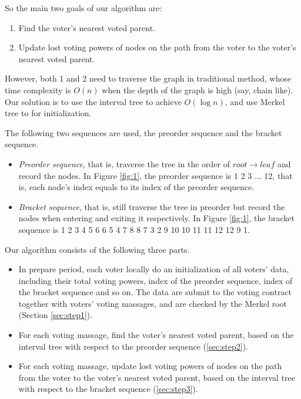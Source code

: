 So the main two goals of our algorithm are:
\begin{enumerate}
	\item Find the voter's nearest voted parent.
	\item Update lost voting powers of nodes on the path from the voter to the voter's nearest voted parent.
\end{enumerate}
However, both 1 and 2 need to traverse the graph in traditional method, whose time complexity is $O(n)$ when the depth of the graph is high (say, chain like). Our solution is to use the interval tree to achieve $O(\log n)$, and use Merkel tree to for initialization.

The following two sequences are used, the preorder sequence and the bracket sequence. 
\begin{itemize}
	\item {\em Preorder sequence}, that is, traverse the tree in the order of $root\rightarrow leaf$ and record the nodes. In Figure \ref{fig:1}, the preorder sequence is 1 2 3 ... 12, that is, each node's index equals to its index of the preorder sequence. 
	\item {\em Bracket sequence}, that is, still traverse the tree in preorder but record the nodes when entering and exiting it respectively.  In Figure \ref{fig:1}, the bracket sequence is 1 2 3 4 5 6 6 5 4 7 8 8 7 3 2 9 10 10 11 11 12 12 9 1.
\end{itemize} 

Our algorithm consists of the following three parts.
\begin{itemize}
	\item In prepare period, each voter locally do an initialization of all voters' data, including their total voting powers, index of the preorder sequence, index of the bracket sequence and so on. The data are submit to the voting contract together with voters' voting massages, and are checked by the Merkel root (Section \ref{sec:step1}).
	\item For each voting massage, find the voter's nearest voted parent, based on the interval tree with respect to the preorder sequence (\ref{sec:step2}).
	\item For each voting  massage, update lost voting powers of nodes on the path from the voter to the voter's nearest voted parent, based on the interval tree with respect to the bracket sequence (\ref{sec:step3}).
\end{itemize}
